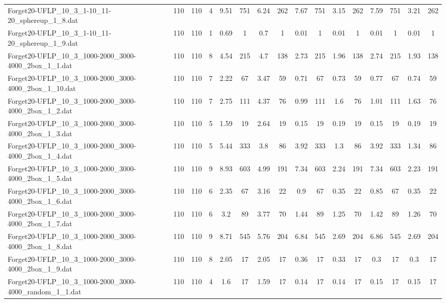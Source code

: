 \begin{sidewaystable}[!ht]
{\begin{tabular}{lccccccccccccccc}
Forget20-UFLP\_10\_3\_1-10\_11-20\_sphereup\_1\_8.dat & 110 & 110 & 4 & 9.51 & 751 & 6.24 & 262 & 7.67 & 751 & 3.15 & 262 & 7.59 & 751 & 3.21 & 262 \\
Forget20-UFLP\_10\_3\_1-10\_11-20\_sphereup\_1\_9.dat & 110 & 110 & 1 & 0.69 & 1 & 0.7 & 1 &  \textcolor{blue2}{0.01} & 1 &  \textcolor{blue2}{0.01} & 1 &  \textcolor{blue2}{0.01} & 1 &  \textcolor{blue2}{0.01} & 1 \\
Forget20-UFLP\_10\_3\_1000-2000\_3000-4000\_2box\_1\_1.dat & 110 & 110 & 8 & 4.54 & 215 & 4.7 & 138 & 2.73 & 215 & 1.96 & 138 & 2.74 & 215 & 1.93 & 138 \\
Forget20-UFLP\_10\_3\_1000-2000\_3000-4000\_2box\_1\_10.dat & 110 & 110 & 7 & 2.22 & 67 & 3.47 & 59 & 0.71 & 67 & 0.73 & 59 & 0.77 & 67 & 0.74 & 59 \\
Forget20-UFLP\_10\_3\_1000-2000\_3000-4000\_2box\_1\_2.dat & 110 & 110 & 7 & 2.75 & 111 & 4.37 & 76 &  \textcolor{blue2}{0.99} & 111 & 1.6 & 76 & 1.01 & 111 & 1.63 & 76 \\
Forget20-UFLP\_10\_3\_1000-2000\_3000-4000\_2box\_1\_3.dat & 110 & 110 & 5 & 1.59 & 19 & 2.64 & 19 &  \textcolor{blue2}{0.15} & 19 & 0.19 & 19 &  \textcolor{blue2}{0.15} & 19 & 0.19 & 19 \\
Forget20-UFLP\_10\_3\_1000-2000\_3000-4000\_2box\_1\_4.dat & 110 & 110 & 5 & 5.44 & 333 & 3.8 & 86 & 3.92 & 333 & 1.3 & 86 & 3.92 & 333 & 1.34 & 86 \\
Forget20-UFLP\_10\_3\_1000-2000\_3000-4000\_2box\_1\_5.dat & 110 & 110 & 9 & 8.93 & 603 & 4.99 & 191 & 7.34 & 603 & 2.24 & 191 & 7.34 & 603 & 2.23 & 191 \\
Forget20-UFLP\_10\_3\_1000-2000\_3000-4000\_2box\_1\_6.dat & 110 & 110 & 6 & 2.35 & 67 & 3.16 & 22 & 0.9 & 67 &  \textcolor{blue2}{0.35} & 22 & 0.85 & 67 &  \textcolor{blue2}{0.35} & 22 \\
Forget20-UFLP\_10\_3\_1000-2000\_3000-4000\_2box\_1\_7.dat & 110 & 110 & 6 & 3.2 & 89 & 3.77 & 70 & 1.44 & 89 & 1.25 & 70 & 1.42 & 89 & 1.26 & 70 \\
Forget20-UFLP\_10\_3\_1000-2000\_3000-4000\_2box\_1\_8.dat & 110 & 110 & 9 & 8.71 & 545 & 5.76 & 204 & 6.84 & 545 & 2.69 & 204 & 6.86 & 545 & 2.69 & 204 \\
Forget20-UFLP\_10\_3\_1000-2000\_3000-4000\_2box\_1\_9.dat & 110 & 110 & 8 & 2.05 & 17 & 2.05 & 17 & 0.36 & 17 & 0.33 & 17 &  \textcolor{blue2}{0.3} & 17 &  \textcolor{blue2}{0.3} & 17 \\
Forget20-UFLP\_10\_3\_1000-2000\_3000-4000\_random\_1\_1.dat & 110 & 110 & 4 & 1.6 & 17 & 1.59 & 17 &  \textcolor{blue2}{0.14} & 17 &  \textcolor{blue2}{0.14} & 17 & 0.15 & 17 & 0.15 & 17 \\

\end{tabular}}
\end{sidewaystable}

